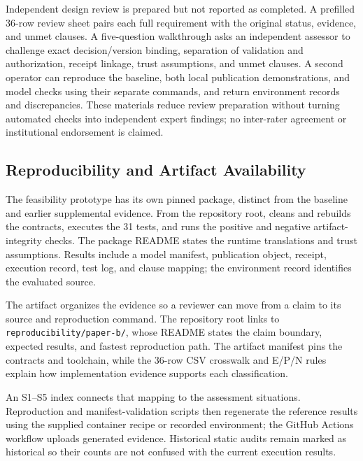 \documentclass[journal]{IEEEtran}
\begin{document}
Independent design review is prepared but not reported as completed. A
prefilled 36-row review sheet pairs each full requirement with the original
status, evidence, and unmet clauses. A five-question walkthrough asks an
independent assessor to challenge exact decision/version binding, separation
of validation and authorization, receipt linkage, trust assumptions, and unmet
clauses. A second operator can reproduce the baseline, both local publication
demonstrations, and model checks using their separate commands, and
return environment records and discrepancies. These materials
reduce review preparation without turning automated checks into independent
expert findings; no inter-rater agreement or institutional endorsement is
claimed.

\subsection{Reproducibility and Artifact Availability}
\label{sec:artifact_availability}

The feasibility prototype has its own pinned package, distinct from the
baseline and earlier supplemental evidence. From the repository root,
cleans and rebuilds the contracts, executes the 31 tests, and runs the
positive and negative artifact-integrity checks. The package README states
the runtime translations and trust assumptions. Results include a model
manifest, publication object, receipt, execution record, test log, and
clause mapping; the environment record identifies the evaluated source.


The artifact organizes the evidence so a reviewer can move from a claim
to its source and reproduction command. The repository root links to
\texttt{reproducibility/paper-b/}, whose README states the claim boundary,
expected results, and fastest reproduction path. The artifact manifest pins
the contracts and toolchain, while the 36-row CSV crosswalk and E/P/N rules
explain how implementation evidence supports each classification.

An S1--S5 index connects that mapping to the assessment situations.
Reproduction and manifest-validation scripts then regenerate the reference
results using the supplied container recipe or recorded environment;
the GitHub Actions workflow uploads generated evidence. Historical static
audits remain marked as historical so their counts are not confused with
the current execution results.
\end{document}
